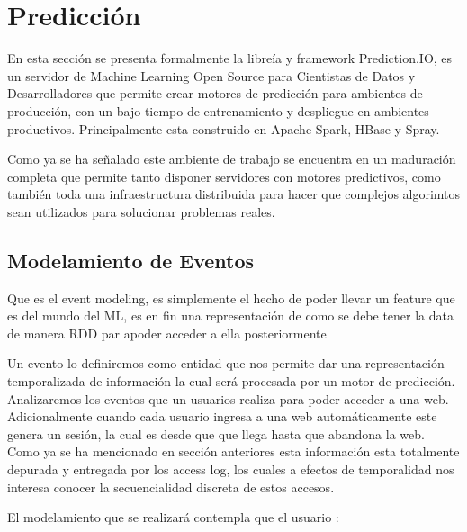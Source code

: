 

\section{Predicción }

  En esta sección se presenta formalmente la libreía y framework Prediction.IO, %
  es un servidor de Machine Learning Open Source para Cientistas de Datos y Desarrolladores que permite
  crear motores de predicción para ambientes de producción, con un bajo tiempo de entrenamiento y despliegue en ambientes productivos. Principalmente esta construido en Apache Spark, HBase y Spray.

  Como ya se ha señalado este ambiente de trabajo se encuentra en un maduración completa que permite tanto disponer
  servidores con motores predictivos, como también toda una infraestructura distribuida para hacer que complejos algorimtos
  sean utilizados para solucionar problemas reales.

  \subsection{Modelamiento de Eventos}


Que es el event modeling, es simplemente el hecho de poder llevar un feature  que es del mundo del ML, es en fin una representación de como se debe tener la data de manera RDD par apoder acceder a ella posteriormente 

  Un evento lo definiremos como entidad que nos permite dar una representación temporalizada de información la cual será procesada por un motor de predicción. Analizaremos los eventos que un usuarios realiza para poder acceder a una web. Adicionalmente cuando cada usuario ingresa a una web automáticamente este genera un sesión, la cual es desde que que llega hasta que abandona la web.
  Como ya se ha mencionado en sección anteriores esta información esta totalmente depurada y entregada por los access log, los cuales a efectos de temporalidad nos interesa conocer la secuencialidad discreta de estos accesos.






  El modelamiento que se realizará contempla que el usuario :


